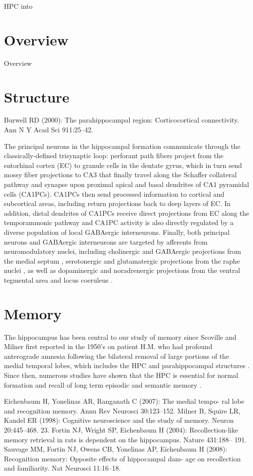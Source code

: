 HPC into

\section{Overview}
Overview

\section{Structure}
Burwell RD (2000): The parahippocampal region: Corticocortical connectivity. Ann N Y Acad Sci 911:25–42.

The principal neurons in the hippocampal formation communicate through the classically-defined trisynaptic loop: perforant path fibers project from the entorhinal cortex (EC) to granule cells in the dentate gyrus, which in turn send mossy fiber projections to CA3 that finally travel along the Schaffer collateral pathway and synapse upon proximal apical and basal dendrites of CA1 pyramidal cells (CA1PCs).
CA1PCs then send processed information to cortical and subcortical areas, including return projections back to deep layers of EC.
In addition, distal dendrites of CA1PCs receive direct projections from EC along the temporammonic pathway and CA1PC activity is also directly regulated by a diverse population of local GABAergic interneurons.
Finally, both principal neurons and GABAergic interneurons are targeted by afferents from neuromodulatory nuclei, including cholinergic and GABAergic projections from the medial septum  \citep{Klausberger2008}, serotonergic and glutamatergic projections from the raphe nuclei \citep{Varga2009}, as well as dopaminergic and noradrenergic projections from the ventral tegmental area \citep{Gasbarri1997} and locus coeruleus \citep{Foote1983}.

\section{Memory}
The hippocampus has been central to our study of memory since Scoville and Milner first reported in the 1950's on patient H.M. who had profound anterograde amnesia following the bilateral removal of large portions of the medial temporal lobes, which includes the HPC and parahippocampal structures \citep{Scoville1957}.
Since then, numerous studies have shown that the HPC is essential for normal formation and recall of long term episodic and semantic memory \citep[reviewd in][]{Eichenbaum2000}\citep{Burgess2002}.


Eichenbaum H, Yonelinas AR, Ranganath C (2007): The medial tempo- ral lobe and recognition memory. Annu Rev Neurosci 30:123–152.
Milner B, Squire LR, Kandel ER (1998): Cognitive neuroscience and the study of memory. Neuron 20:445–468.
23.
Fortin NJ, Wright SP, Eichenbaum H (2004): Recollection-like memory retrieval in rats is dependent on the hippocampus. Nature 431:188– 191.
Sauvage MM, Fortin NJ, Owens CB, Yonelinas AP, Eichenbaum H (2008): Recognition memory: Opposite effects of hippocampal dam- age on recollection and familiarity. Nat Neurosci 11:16–18.

